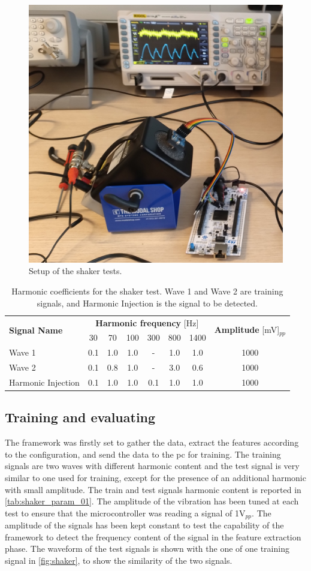 \begin{figure}
    \centering
    \includegraphics[width=.4\textwidth]{Images/shaker/IMG_20231207_103126143.jpg}
    \caption{Setup of the shaker tests.}
    \label{fig:shaker_setup}
\end{figure}
\begin{table}
    \centering
    \caption{Harmonic coefficients for the shaker test. Wave 1 and Wave 2 are training signals, and Harmonic Injection is the signal to be detected.}
    \label{tab:shaker_param_01}
    \begin{tabular}{lccccccc} 
    \toprule
    \multirow{2}{*}{\textbf{Signal Name }} & \multicolumn{6}{c}{\textbf{Harmonic frequency} [Hz]} & \multirow{2}{*}{\textbf{Amplitude} [mV]$_{pp}$} \\
     & 30 & 70 & 100 & 300 & 800 & 1400 &  \\ 
    \hline
    Wave 1 & 0.1 & 1.0 & 1.0 & \multicolumn{1}{c}{-} & 1.0 & 1.0 & 1000 \\
    Wave 2 & 0.1 & 0.8 & 1.0 & \multicolumn{1}{c}{-} & 3.0 & 0.6 & 1000 \\
    Harmonic Injection & 0.1 & 1.0 & 1.0 & 0.1 & 1.0 & 1.0 & 1000 \\
    \bottomrule
    \end{tabular}
    \end{table}

\subsection{Training and evaluating}
The framework was firstly set to gather the data, extract the features according to the configuration, and send the data to the \gls{pc} for training. The training signals are two waves with different harmonic content and the test signal is very similar to one used for training, except for the presence of an additional harmonic with small amplitude. The train and test signals harmonic content is reported in \autoref{tab:shaker_param_01}. The amplitude of the vibration has been tuned at each test to ensure that the microcontroller was reading a signal of 1V$_{pp}$. The amplitude of the signals has been kept constant to test the capability of the framework to detect the frequency content of the signal in the feature extraction phase. The waveform of the test signals is shown with the one of one training signal in \autoref{fig:shaker}, to show the similarity of the two signals. 

